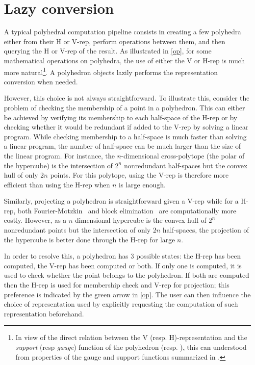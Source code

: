 \documentclass{juliacon}
\newcommand{\Vrep}{V-rep}
\newcommand{\hrep}{H-rep}
\begin{document}
\section{Lazy conversion}

A typical polyhedral computation pipeline consists in creating a few polyhedra
either from their H or \Vrep{}, perform operations between them,
and then querying the H or \Vrep{} of the result.
As illustrated in \cref{op}, for some mathematical operations on polyhedra,
the use of either the V or \hrep{} is much more natural\footnote{%
  In view of the direct relation between the V (resp. H)-representation and the \emph{support} (resp \emph{gauge}) function
  of the polyhedron \cite[Proposition~A.30]{legat2023Chapter} (resp. \cite[Proposition~A.27]{legat2023Chapter}),
  this can understood from properties of the gauge and support functions summarized in \cite[Table~2]{legat2023Chapter}.
}.
A polyhedron objects lazily performs the representation conversion
when needed.

However, this choice is not always straightforward.
To illustrate this, consider the problem of
checking the membership of a point in a polyhedron.
This can either be achieved by verifying its membership to
each half-space of the \hrep{} or by checking whether it
would be redundant if added to the \Vrep{} by solving a linear program.
While checking membership to a half-space is much faster
than solving a linear program,
the number of half-space can be much larger than the size of the linear program.
For instance, the $n$-dimensional cross-polytope (the polar of the hypercube)
is the intersection of $2^n$ nonredundant half-spaces but the convex hull
of only $2n$ points.
For this polytope, using the \Vrep{} is therefore more efficient than using the \hrep{} when $n$ is large enough.

Similarly, projecting a polyhedron is straightforward given a \Vrep{}
while for a \hrep{}, both Fourier-Motzkin~\cite[p.~155–156]{schrijver1986Theory}
and block elimination~\cite{fukuda2003cddlib} are computationally more costly.
However, as a $n$-dimensional hypercube is the convex hull of $2^n$ nonredundant points but
the intersection of only $2n$ half-spaces,
the projection of the hypercube is better done through the \hrep{} for large $n$.

In order to resolve this, a polyhedron has 3 possible states:
the \hrep{} has been computed,
the \Vrep{} has been computed or
both.
If only one is computed, it is used to check whether the point belongs to the polyhedron.
If both are computed then the \hrep{} is used for membership check and \Vrep{} for projection;
this preference is indicated by the green arrow in \cref{op}.
The user can then influence the choice of representation used
by explicitly requesting the computation of such representation beforehand.
\end{document}
